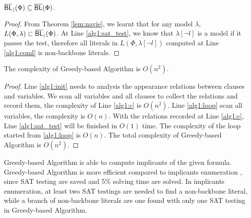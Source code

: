 \begin{theorem}
${\sf \overline{BL}_\downharpoonright}(\Phi)\subseteq\overline{\textsf{BL}}(\Phi)$.
\end{theorem}

\begin{proof}
From Theorem \ref{lem:navie}, we learnt that for any model $\lambda$, $L(\Phi,\lambda)\subset{\sf \overline{BL}_\downharpoonright}(\Phi)$. At Line \ref{alg1:sat_test}, we know that $\lambda[\neg l]$ is a model if it passes the test, therefore all literals in $L(\Phi,\lambda[\neg l])$ computed at Line \ref{alg1:coml} is non-backbone literals.
\end{proof}

\begin{theorem}
The complexity of Greedy-based Algorithm is $O(n^2)$.
\end{theorem}

\begin{proof}
Line \ref{alg1:init} needs to analysis the appearance relations between clauses and variables. We scan all variables and all clauses to collect the relations and record them, the complexity of Line \ref{alg1:c} is $O(n^2)$. Line \ref{alg1:loop} scan all variables, the complexity is $O(n)$. With the relations recorded at Line \ref{alg1:c}, Line \ref{alg1:sat_test} will be finished in $O(1)$ time. The complexity of the loop started from \ref{alg1:loop} is $O(n)$. The total complexity of Greedy-based Algorithm is $O(n^2)$.
\end{proof}

Greedy-based Algorithm is able to compute implicants of the given formula.
Greedy-based Algorithm is more efficient compared to implicants enumeration \cite{JLM15}, since SAT testing are saved and 5\% solving time are solved. In implicants enumeration, at least two SAT testings are needed to find a non-backbone literal, while a branch of non-backbone literals are one found with only one SAT testing in Greedy-based Algorithm.


